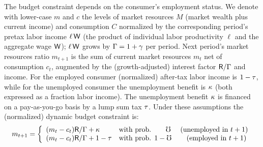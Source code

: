 \documentclass[titlepage]{\econtex}
\begin{document}
 The budget constraint depends on the consumer's employment status. %
  We denote  with lower-case $m$ and $c$ the levels of market resources $M$ (market wealth plus current income) and consumption $C$ normalized by the corresponding period's pretax labor income $\ell\,\mathsf{W}$ (the product of individual labor productivity $\ell$ and the aggregate wage $\mathsf{W}$); $\ell\,\mathsf{W}$ grows by $\Gamma=1+\gamma$ per period.  Next period's market resources ratio $m_{t+1}$ is the sum of current market resources $m_{t}$ net of consumption $c_t$, augmented by the (growth-adjusted) interest factor $\mathsf{R}/\Gamma$ and income. For the employed consumer (normalized) after-tax labor income is $1-\tau$, while for the unemployed consumer the unemployment benefit is $\kappa$ (both expressed as a fraction labor income). The unemployment benefit $\kappa$ is financed on a pay-as-you-go basis by a lump sum tax $\tau$.  Under these assumptions the (normalized) dynamic budget constraint is:
\begin{equation}
    m_{t+1}=\left\{
    \begin{array}{ll}
    (m_{t}-c_t)\mathsf{R}/\Gamma+\kappa & \mbox{with prob. }\phantom{1-~}\mho \quad \text{          (unemployed in $t+1$)}\\
    (m_{t}-c_t)\mathsf{R}/\Gamma+1-\tau  & \mbox{with prob. }1-\mho           \quad \text{\phantom{un}(employed in $t+1$)}
    \end{array}
  \right. \label{eq:dbc}
\end{equation} %
\end{document}
